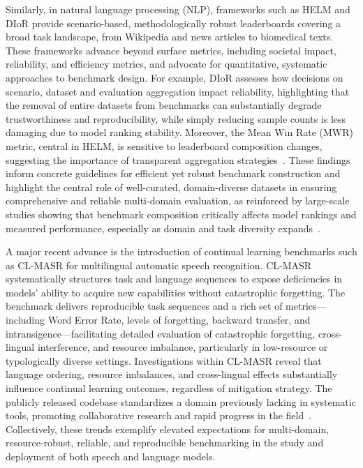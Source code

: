 \documentclass[sigconf]{acmart}
\begin{document}
Similarly, in natural language processing (NLP), frameworks such as HELM and DIoR provide scenario-based, methodologically robust leaderboards covering a broad task landscape, from Wikipedia and news articles to biomedical texts. These frameworks advance beyond surface metrics, including societal impact, reliability, and efficiency metrics, and advocate for quantitative, systematic approaches to benchmark design. For example, DIoR assesses how decisions on scenario, dataset and evaluation aggregation impact reliability, highlighting that the removal of entire datasets from benchmarks can substantially degrade trustworthiness and reproducibility, while simply reducing sample counts is less damaging due to model ranking stability. Moreover, the Mean Win Rate (MWR) metric, central in HELM, is sensitive to leaderboard composition changes, suggesting the importance of transparent aggregation strategies~\cite{ref104}. These findings inform concrete guidelines for efficient yet robust benchmark construction and highlight the central role of well-curated, domain-diverse datasets in ensuring comprehensive and reliable multi-domain evaluation, as reinforced by large-scale studies showing that benchmark composition critically affects model rankings and measured performance, especially as domain and task diversity expands~\cite{ref106}.

A major recent advance is the introduction of continual learning benchmarks such as CL-MASR for multilingual automatic speech recognition. CL-MASR systematically structures task and language sequences to expose deficiencies in models' ability to acquire new capabilities without catastrophic forgetting. The benchmark delivers reproducible task sequences and a rich set of metrics—including Word Error Rate, levels of forgetting, backward transfer, and intransigence—facilitating detailed evaluation of catastrophic forgetting, cross-lingual interference, and resource imbalance, particularly in low-resource or typologically diverse settings. Investigations within CL-MASR reveal that language ordering, resource imbalances, and cross-lingual effects substantially influence continual learning outcomes, regardless of mitigation strategy. The publicly released codebase standardizes a domain previously lacking in systematic tools, promoting collaborative research and rapid progress in the field~\cite{ref102}. Collectively, these trends exemplify elevated expectations for multi-domain, resource-robust, reliable, and reproducible benchmarking in the study and deployment of both speech and language models.
\end{document}
